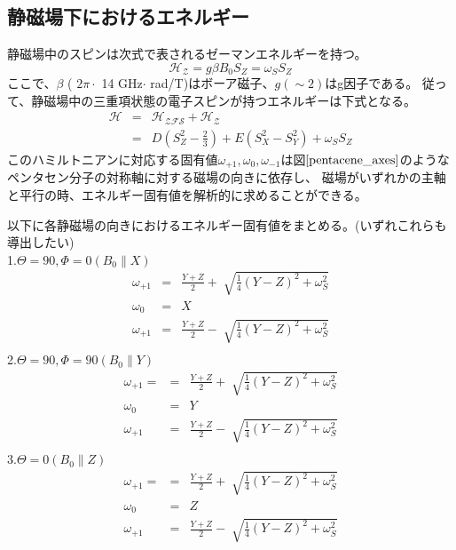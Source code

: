  \subsection{静磁場下におけるエネルギー}
 静磁場中のスピンは次式で表されるゼーマンエネルギーを持つ。
 \begin{equation}
   \mathcal{H_Z}=g\beta B_0 S_Z = \omega_S S_Z 
 \end{equation}
 ここで、$\beta $ ( $2\pi \cdot$ 14 GHz$\cdot$ rad/T)はボーア磁子、$g(\sim 2)$はg因子である。
 従って、静磁場中の三重項状態の電子スピンが持つエネルギーは下式となる。
 \begin{eqnarray}
   \mathcal{H}&=&\mathcal{H_{ZFS}}+\mathcal{H_Z}\\
   &=&D(S_Z^2-\frac{2}{3})+E(S_X^2-S_Y^2)+\omega_S S_Z
 \end{eqnarray}
 このハミルトニアンに対応する固有値$\omega_{+1},\omega_0,\omega_{-1}$は図$\ref{pentacene_axes}$のようなペンタセン分子の対称軸に対する磁場の向きに依存し、
 磁場がいずれかの主軸と平行の時、エネルギー固有値を解析的に求めることができる。
 
 
 
 以下に各静磁場の向きにおけるエネルギー固有値をまとめる。(いずれこれらも導出したい)\\
 1.$\Theta=90,\Phi=0(B_0\parallel X)$
 \begin{eqnarray}
   \omega _{+1}&=&\frac{Y+Z}{2}+\sqrt[]{\frac{1}{4}(Y-Z)^2+\omega_S^2} \\
   \omega _0&=&X\\
   \omega _{+1}&=&\frac{Y+Z}{2}-\sqrt[]{\frac{1}{4}(Y-Z)^2+\omega_S^2} \\
 \end{eqnarray}
 2.$\Theta=90,\Phi=90(B_0\parallel Y)$
 \begin{eqnarray}
   \omega _{+1}=&=&\frac{Y+Z}{2}+\sqrt[]{\frac{1}{4}(Y-Z)^2+\omega_S^2} \\
   \omega _0&=&Y\\
   \omega _{+1}&=&\frac{Y+Z}{2}-\sqrt[]{\frac{1}{4}(Y-Z)^2+\omega_S^2} \\
 \end{eqnarray}
 3.$\Theta=0(B_0\parallel Z)$
 \begin{eqnarray}
   \omega _{+1}=&=&\frac{Y+Z}{2}+\sqrt[]{\frac{1}{4}(Y-Z)^2+\omega_S^2} \\
   \omega _0&=&Z\\
   \omega _{+1}&=&\frac{Y+Z}{2}-\sqrt[]{\frac{1}{4}(Y-Z)^2+\omega_S^2} \\
 \end{eqnarray}



